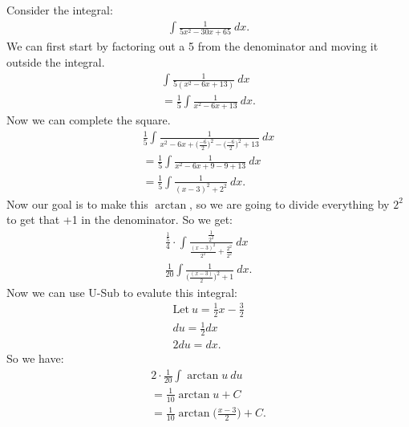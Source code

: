 \documentclass{report}
\begin{document}
      \bigbreak \noindent 
      Consider the integral:
      \begin{align*}
          \int \frac{1}{5x^{2} -30x+65}\ dx
      .\end{align*}
      \bigbreak \noindent \bigbreak \noindent 
      We can first start by factoring out a 5 from the denominator and moving it outside the integral.
      \begin{align*}
          \int \frac{1}{5(x^{2} - 6x +13)}\ dx \\
          = \frac{1}{5} \int \frac{1}{x^{2} - 6x + 13}\ dx
      .\end{align*}
      \bigbreak \noindent \bigbreak \noindent 
      Now we can complete the square.
      \begin{align*}
          \frac{1}{5} \int \frac{1}{x^{2}-6x + \bigg(\frac{-6}{2}\bigg)^{2} - \bigg(\frac{-6}{2}\bigg)^{2} +13}\ dx \\
           = \frac{1}{5}\int \frac{1}{x^{2}-6x + 9 - 9 + 13}\ dx \\
           = \frac{1}{5} \int \frac{1}{(x-3)^{2} + 2^{2}}\ dx
      .\end{align*}
      \bigbreak \noindent 
      \bigbreak \noindent \bigbreak \noindent 
      Now our goal is to make this $\arctan{}$, so we are going to divide everything by $2^{2}$ to get that +1 in the denominator.
      \bigbreak \noindent 
      So we get:
      \begin{align*}
          \frac{\frac{1}{5}}{4}\cdot \int \frac{\frac{1}{2^{2}}}{\frac{(x-3)^{2}}{2^{2}} + \frac{2^{2}}{2^{2}}}\ dx \\
          \frac{1}{20}\int \frac{1}{\bigg(\frac{(x-3)}{2}\bigg)^{2} + 1}\ dx
      .\end{align*}
      \bigbreak \noindent \bigbreak \noindent 
      Now we can use U-Sub to evalute this integral:
      \begin{align*}
          \text{Let}\ u=\frac{1}{2}x - \frac{3}{2} \\
          du = \frac{1}{2}dx \\
          2du = dx
      .\end{align*}
      \bigbreak \noindent \bigbreak \noindent 
      So we have:
      \begin{align*}
          2 \cdot \frac{1}{20} \int \arctan{u}\ du \\
          = \frac{1}{10}\arctan{u}  + C \\
          = \frac{1}{10} \arctan{\bigg(\frac{x-3}{2}}\bigg)  + C 
      .\end{align*}
\end{document}
